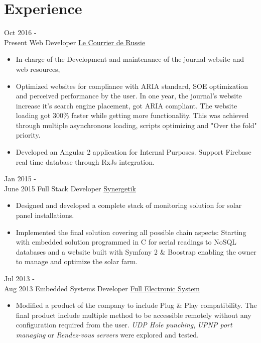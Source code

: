 \documentclass[a4paper]{template} %
\begin{document}
\section{Experience}

\begin{twenty} %
    \twentyitem
   		{Oct 2016 - \\ Present}
        {Web Developer}
        {\href{http://www.lecourrierderussie.com}{Le Courrier de Russie}}
        {}
        {
        {\begin{itemize}
        \item In charge of the Development and maintenance of the journal website and web resources,
        \item Optimized websites for compliance with ARIA standard, SOE optimization and perceived performance by the user. In one year, the journal's website increase it's search engine placement, got ARIA compliant. The website loading got 300\% faster while getting more functionality. This was achieved through multiple asynchronous loading, scripts optimizing and "Over the fold" priority.
        \item Developed an Angular 2 application for Internal Purposes. Support Firebase real time database through RxJs integration.
    \end{itemize}}
        }

     \twentyitem
   		{Jan 2015 - \\ June 2015}
        {Full Stack Developer}
        {\href{http://synergetik.fr/}{Synergetik}}
        {}
        {
        \begin{itemize}
        \item Designed and developed a complete stack of monitoring solution for solar panel installations.
        \item Implemented the final solution covering all possible chain aspects: Starting with embedded solution programmed in C for serial readings to NoSQL databases and a website built with Symfony 2 \& Boostrap enabling the owner to manage and optimize the solar farm.
    \end{itemize}
    	}

    	\twentyitem
   		{Jul 2013 - \\ Aug 2013}
        {Embedded Systems Developer}
        {\href{http://www.fesys.fr/fr}{Full Electronic System}}
        {}
        {
        \begin{itemize}
        \item Modified a product of the company to include Plug \& Play compatibility. The final product include multiple method to be accessible remotely without any configuration required from the user. \textit{UDP Hole punching}, \textit{UPNP port managing} or \textit{Rendez-vous servers} were explored and tested.
    \end{itemize}
    	}

\end{twenty}
\end{document}
